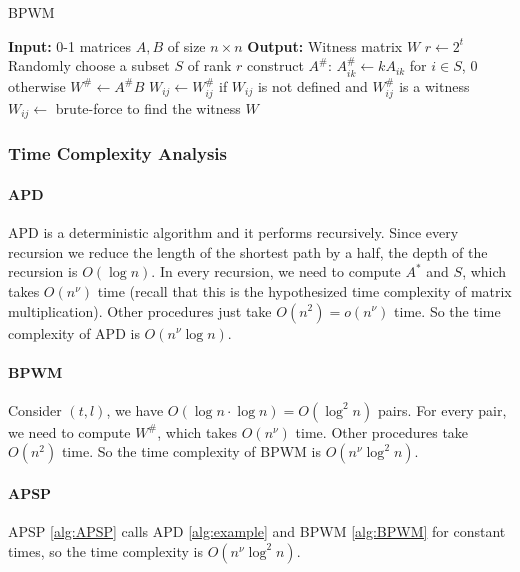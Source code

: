 \documentclass[11pt]{article}
\theoremstyle{plain}
\begin{document}
\begin{algorithm}
    \caption{BPWM}
    \label{alg:BPWM}
    \begin{algorithmic}[1]
        \STATE \textbf{Input:} 0-1 matrices $A,B$ of size $n\times n$
        \STATE \textbf{Output:} Witness matrix $W$
            \STATE $r\leftarrow 2^t$
                \STATE Randomly choose a subset $S$ of rank $r$
                \STATE construct $A^{\#}$: $A^{\#}_{ik}\leftarrow kA_{ik}$ for $i\in S$, $0$ otherwise
                \STATE $W^{\#}\leftarrow A^{\#}B$
                    \STATE $W_{ij}\leftarrow W^{\#}_{ij}$ if $W_{ij}$ is not defined and $W^{\#}_{ij}$ is a witness
                \ENDFOR
            \ENDFOR
        \ENDFOR
                \STATE $W_{ij}\leftarrow$ brute-force to find the witness
            \ENDIF
        \ENDFOR
    \RETURN $W$
    \end{algorithmic}
\end{algorithm}

\subsubsection{Time Complexity Analysis}

\paragraph{APD} APD is a deterministic algorithm and it performs recursively. Since every recursion we reduce the length of the shortest path by a half, the depth of the recursion is $O(\log n)$. In every recursion, we need to compute $A^*$ and $S$, which takes $O(n^{\nu})$ time (recall that this is the hypothesized time complexity of matrix multiplication). Other procedures just take $O(n^2)=o(n^{\nu})$ time. So the time complexity of APD is $O(n^{\nu}\log n)$.

\paragraph{BPWM} Consider $(t,l)$, we have $O(\log n\cdot \log n)=O(\log^2 n)$ pairs. For every pair, we need to compute $W^{\#}$, which takes $O(n^{\nu})$ time. Other procedures take $O(n^2)$ time. So the time complexity of BPWM is $O(n^{\nu}\log^2 n)$.

\paragraph{APSP} APSP \ref{alg:APSP} calls APD \ref{alg:example} and BPWM \ref{alg:BPWM} for constant times, so the time complexity is $O(n^{\nu}\log^2 n)$.
\end{document}
